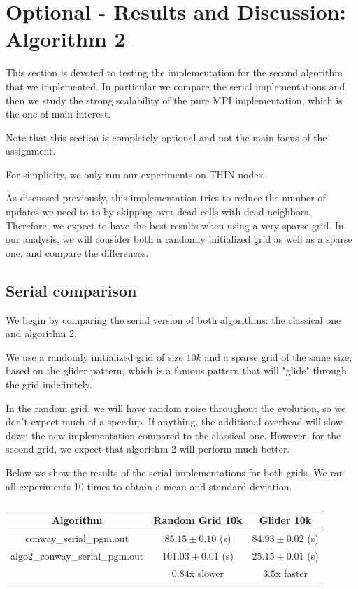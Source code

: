 \documentclass{report}
\begin{document}
\section{Optional - Results and Discussion: Algorithm 2}

This section is devoted to testing the implementation for the second algorithm that 
we implemented. In particular we compare the serial implementations and then 
we study the strong scalability of the pure MPI implementation, which is the one 
of main interest. 

Note that this section is completely optional and not the main focus of the assignment. 

For simplicity, we only run our experiments on THIN nodes. 

As discussed previously, this implementation tries to reduce the number of updates 
we need to to by skipping over dead cells with dead neighbors. Therefore, we expect 
to have the best results when using a very sparse grid. In our analysis, we will 
consider both a randomly initialized grid as well as a sparse one, and compare the 
differences. 

\subsection{Serial comparison}

We begin by comparing the serial version of both algorithms: the classical one 
and algorithm 2. 

We use a randomly initialized grid of size $10k$ and a sparse grid of the same 
size, based on the glider pattern\cite{glider}, which is a famous pattern that 
will "glide" through the grid indefinitely. 

In the random grid, we will have random noise throughout the evolution, so we 
don't expect much of a speedup. If anything, the additional overhead will slow 
down the new implementation compared to the classical one. However, for the 
second grid, we expect that algorithm 2 will perform much better. 

Below we show the results of the serial implementations for both grids. We ran 
all experiments 10 times to obtain a mean and standard deviation.

\begin{table}[H]
\centering
\begin{tabular}{|c|c|c|}
    \hline
    Algorithm                      &   Random Grid 10k       & Glider 10k             \\ \hline
    conway\_serial\_pgm.out        &   $85.15 \pm 0.10$ (s)  & $84.93 \pm 0.02$ (s)   \\
    algo2\_conway\_serial\_pgm.out &   $101.03 \pm 0.01$ (s) & $25.15 \pm 0.01$ (s)   \\ \hline
                                   &   $0.84$x slower        & $ 3.5$x faster         \\ \hline
\end{tabular}
\caption{\label{tab:a2serial}}
\end{table}
\end{document}
